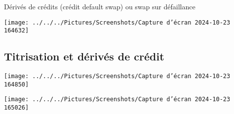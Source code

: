 \documentclass[a4paper, 12pt]{report}
\begin{document}
Dérivés de crédits (crédit default swap) ou swap sur défaillance

\begin{center}
\texttt{[image: ../../../Pictures/Screenshots/Capture d'écran 2024-10-23 164632]}
\end{center}

\subsection{Titrisation et dérivés de crédit}

\begin{center}
	\texttt{[image: ../../../Pictures/Screenshots/Capture d'écran 2024-10-23 164850]}
\end{center}

\begin{center}
	\texttt{[image: ../../../Pictures/Screenshots/Capture d'écran 2024-10-23 165026]}
\end{center}
\end{document}
